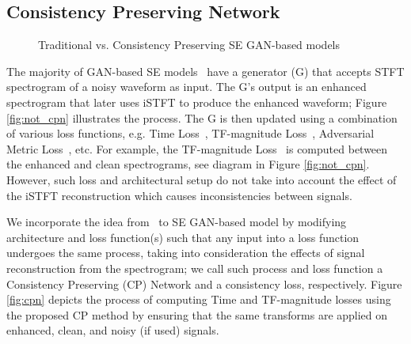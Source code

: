 \documentclass{article}
\begin{document}
\subsection{Consistency Preserving Network}\label{ss:cpgen}

\begin{figure*}[ht!]
    \centering
    \hfill
    \label{fig:cpn_total}
    \caption{Traditional vs. Consistency Preserving SE GAN-based models}
\end{figure*}

The majority of GAN-based SE models~\cite{pmlr-v97-fu19b, cao2022cmgan, 9746273, 9746171} have a generator (G) that accepts STFT spectrogram of a noisy waveform as input. The G's output is an enhanced spectrogram that later uses iSTFT to produce the enhanced waveform; Figure \ref{fig:not_cpn} illustrates the process. The G is then updated using a combination of various loss functions, e.g. Time Loss~\cite{cross_domain_losses_for_se}, TF-magnitude Loss~\cite{Braun2021ACV}, Adversarial Metric Loss~\cite{pmlr-v97-fu19b}, etc. For example, the TF-magnitude Loss~\cite{Braun2021ACV} is computed between the enhanced and clean spectrograms, see diagram in Figure \ref{fig:not_cpn}. However, such loss and architectural setup do not take into account the effect of the iSTFT reconstruction which causes inconsistencies between signals. 



We incorporate the idea from~\cite{Braun2021TowardsEM} to SE GAN-based model by modifying architecture and loss function(s) such that any input into a loss function undergoes the same process, taking into consideration the effects of signal reconstruction from the spectrogram; we call such process and loss function a Consistency Preserving (CP) Network and a consistency loss, respectively. Figure \ref{fig:cpn} depicts the process of computing Time and TF-magnitude losses using the proposed CP method by ensuring that the same transforms are applied on enhanced, clean, and noisy (if used) signals. 
\end{document}
